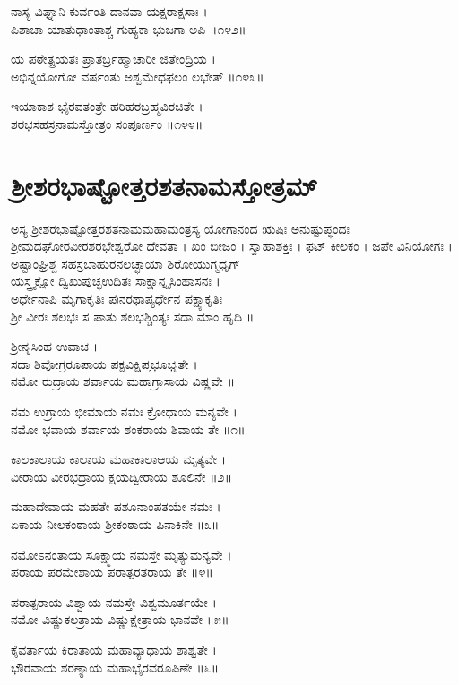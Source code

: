 ನಾಸ್ಯ ವಿಘ್ನಾನಿ ಕುರ್ವಂತಿ ದಾನವಾ ಯಕ್ಷರಾಕ್ಷಸಾಃ ।\\
ಪಿಶಾಚಾ ಯಾತುಧಾಂತಾಶ್ಚ ಗುಹ್ಯಕಾ ಭುಜಗಾ ಅಪಿ ॥೧೪೨॥

ಯ ಪಠೇತ್ಪ್ರಯತಃ ಪ್ರಾತರ್ಬ್ರಹ್ಮಾಚಾರೀ ಜಿತೇಂದ್ರಿಯ ।\\
ಅಭಿನ್ನಯೋಗೋ ವರ್ಷಂತು ಅಶ್ವಮೇಧಫಲಂ ಲಭೇತ್ ॥೧೪೩॥

ಇಯಾಕಾಶ ಭೈರವತಂತ್ರೇ ಹರಿಹರಬ್ರಹ್ಮವಿರಚಿತೇ ।\\
ಶರಭಸಹಸ್ರನಾಮಸ್ತೋತ್ರಂ ಸಂಪೂರ್ಣಂ ॥೧೪೪॥

\section{ಶ್ರೀಶರಭಾಷ್ಟೋತ್ತರಶತನಾಮಸ್ತೋತ್ರಮ್}

ಅಸ್ಯ ಶ್ರೀಶರಭಾಷ್ಟೋತ್ತರಶತನಾಮಮಹಾಮಂತ್ರಸ್ಯ ಯೋಗಾನಂದ ಋಷಿಃ  ಅನುಷ್ಟುಪ್ಛಂದಃ ಶ್ರೀಮದಘೋರವೀರಶರಭೇಶ್ವರೋ ದೇವತಾ । ಖಂ ಬೀಜಂ । ಸ್ವಾಹಾಶಕ್ತಿಃ । ಫಟ್ ಕೀಲಕಂ । ಜಪೇ ವಿನಿಯೋಗಃ ।\\

ಅಷ್ಟಾಂಘ್ರಿಶ್ಚ ಸಹಸ್ರಬಾಹುರನಲಚ್ಛಾಯಾ ಶಿರೋಯುಗ್ಮಧೃಗ್\\
ಯಸ್ತ್ರ್ಯಕ್ಷೋ ದ್ವಿಖುಪುಚ್ಛಉದಿತಃ ಸಾಕ್ಷಾನ್ನೃಸಿಂಹಾಸನಃ ।\\
ಅರ್ಧೇನಾಪಿ ಮೃಗಾಕೃತಿಃ ಪುನರಥಾಪ್ಯರ್ಧೇನ ಪಕ್ಷ್ಯಾಕೃತಿಃ\\
ಶ್ರೀ ವೀರಃ ಶಲಭಃ ಸ ಪಾತು ಶಲಭಶ್ಚಿಂತ್ಯಃ ಸದಾ ಮಾಂ ಹೃದಿ ॥

ಶ್ರೀನೃಸಿಂಹ ಉವಾಚ ।\\
ಸದಾ ಶಿವೋಗ್ರರೂಪಾಯ ಪಕ್ಷವಿಕ್ಷಿಪ್ತಭೂಭೃತೇ ।\\
ನಮೋ ರುದ್ರಾಯ ಶರ್ವಾಯ ಮಹಾಗ್ರಾಸಾಯ ವಿಷ್ಣವೇ ॥

ನಮ ಉಗ್ರಾಯ ಭೀಮಾಯ ನಮಃ ಕ್ರೋಧಾಯ ಮನ್ಯವೇ ।\\
ನಮೋ ಭವಾಯ ಶರ್ವಾಯ ಶಂಕರಾಯ ಶಿವಾಯ ತೇ ॥೧॥

ಕಾಲಕಾಲಾಯ ಕಾಲಾಯ ಮಹಾಕಾಲಾಆಯ ಮೃತ್ಯವೇ ।\\
ವೀರಾಯ ವೀರಭದ್ರಾಯ ಕ್ಷಯದ್ವೀರಾಯ ಶೂಲಿನೇ ॥೨॥

ಮಹಾದೇವಾಯ ಮಹತೇ ಪಶೂನಾಂಪತಯೇ ನಮಃ ।\\
ಏಕಾಯ ನೀಲಕಂಠಾಯ ಶ್ರೀಕಂಠಾಯ ಪಿನಾಕಿನೇ ॥೩॥

ನಮೋಽನಂತಾಯ ಸೂಕ್ಷ್ಮಾಯ ನಮಸ್ತೇ ಮೃತ್ಯುಮನ್ಯವೇ ।\\
ಪರಾಯ ಪರಮೇಶಾಯ ಪರಾತ್ಪರತರಾಯ ತೇ ॥೪॥

ಪರಾತ್ಪರಾಯ ವಿಶ್ವಾಯ ನಮಸ್ತೇ ವಿಶ್ವಮೂರ್ತಯೇ ।\\
ನಮೋ ವಿಷ್ಣುಕಲತ್ರಾಯ ವಿಷ್ಣುಕ್ಷೇತ್ರಾಯ ಭಾನವೇ ॥೫॥

ಕೈವರ್ತಾಯ ಕಿರಾತಾಯ ಮಹಾವ್ಯಾಧಾಯ ಶಾಶ್ವತೇ ।\\
ಭೌರವಾಯ ಶರಣ್ಯಾಯ ಮಹಾಭೈರವರೂಪಿಣೇ ॥೬॥

